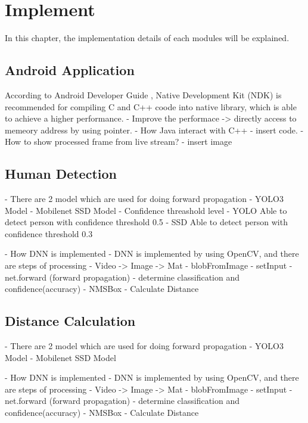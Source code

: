 \chapter{Implement}\label{implement}

    In this chapter, the implementation details of each modules will be explained.

    \section{Android Application}
            According to Android Developer Guide \cite{ANDROID-01},
            Native Development Kit (NDK) is recommended for compiling C and C++ coode into native library,
            which is able to achieve a higher performance.
            - Improve the performace -> directly access to memeory address by using pointer.
            - How Java interact with C++
                - insert code.
            - How to show processed frame from live stream?
                - insert image

    \section{Human Detection}
        -	There are 2 model which are used for doing forward propagation
            - YOLO3 Model
            - Mobilenet SSD Model
            - Confidence threashold  level
                - YOLO Able to detect person with confidence threshold 0.5
                - SSD Able to detect person with confidence threshold 0.3

        -	How DNN is implemented
            - DNN is implemented by using OpenCV, and there are steps of processing
                - Video -> Image -> Mat
                - blobFromImage
                - setInput
                - net.forward (forward propagation)
                - determine classification and confidence(accuracy)
                - NMSBox
                - Calculate Distance

        \section{Distance Calculation}
            -	There are 2 model which are used for doing forward propagation
                - YOLO3 Model
                - Mobilenet SSD Model

            -	How DNN is implemented
                - DNN is implemented by using OpenCV, and there are steps of processing
                    - Video -> Image -> Mat
                    - blobFromImage
                    - setInput
                    - net.forward (forward propagation)
                    - determine classification and confidence(accuracy)
                    - NMSBox
                    - Calculate Distance

